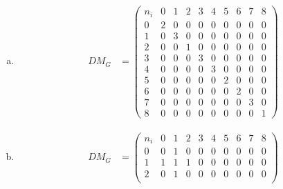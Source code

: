 \documentclass[10pt,letterpaper, cm]{hmcpset}
\begin{document}
\begin{enumerate}[(a)]

    \item 
    
    \begin{align*}

      DM_G &= \begin{pmatrix}


         n_i & 0 & 1 & 2 & 3 & 4 & 5 & 6 & 7 & 8 \\        

         0   & 2 & 0 & 0 & 0 & 0 & 0 & 0 & 0 & 0 \\

         1   & 0 & 3 & 0 & 0 & 0 & 0 & 0 & 0 & 0 \\

         2   & 0 & 0 & 1 & 0 & 0 & 0 & 0 & 0 & 0 \\

         3   & 0 & 0 & 0 & 3 & 0 & 0 & 0 & 0 & 0  \\

         4   & 0 & 0 & 0 & 0 & 3 & 0 & 0 & 0 & 0 \\

         5   & 0 & 0 & 0 & 0 & 0 & 2 & 0 & 0 & 0 \\

         6   & 0 & 0 & 0 & 0 & 0 & 0 & 2 & 0 & 0 \\

         7   & 0 & 0 & 0 & 0 & 0 & 0 & 0 & 3 & 0 \\

         8   & 0 & 0 & 0 & 0 & 0 & 0 & 0 & 0 & 1

      \end{pmatrix}  
              \end{align*}
    \item 
    
    \begin{align*}

      DM_G &= \begin{pmatrix}


         n_i & 0 & 1 & 2 & 3 & 4 & 5 & 6 & 7 & 8 \\        

         0   & 0 & 1 & 0 & 0 & 0 & 0 & 0 & 0 & 0 \\

         1   & 1 & 1 & 1 & 0 & 0 & 0 & 0 & 0 & 0 \\

         2   & 0 & 1 & 0 & 0 & 0 & 0 & 0 & 0 & 0 \\


\end{pmatrix}
\end{align*}
\end{enumerate}
\end{document}
